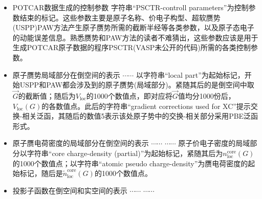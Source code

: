 \begin{itemize}
	\item \textrm{POTCAR}数据生成的控制参数
{\fontsize{8.2pt}{6.2pt}\selectfont{
}}
字符串``PSCTR-controll parameters''为控制参数结束的标记。这些参数主要是原子名称、价电子构型、超软赝势\textrm{(USPP)}\textrm{PAW}方法产生原子赝势所需的截断半经等各类参数，以及原子态电子的动能误差信息。熟悉赝势和\textrm{PAW}方法的读者不难猜出，这些参数应该是用于生成\textrm{POTCAR}原子数据的程序\textrm{PSCTR}(\textrm{VASP}未公开的代码)所需的各类控制参数。
\item 原子赝势局域部分在倒空间的表示
{\fontsize{8.2pt}{6.2pt}\selectfont{
}}
$\cdots\cdots$
{\fontsize{8.2pt}{6.2pt}\selectfont{
}}
以字符串``local part''为起始标记，开始\textrm{USPP}和\textrm{PAW}都会涉及到的原子赝势(局域部分)。紧随其后的是倒空间中取$\vec G$的截断值；随后为$V_{\mathrm{loc}}$的1000个数值点，即对应将$\vec G$值均分1000份后，$V_{\mathrm{loc}}(G)$的各数值点。此后的字符串``gradient corrections used for XC''提示交换-相关泛函，其随后的数值5表示该处原子势中的交换-相关部分采用\textrm{PBE}泛函形式。
 \item 原子赝电荷密度的局域部分在倒空间的表示
{\fontsize{8.2pt}{6.2pt}\selectfont{
}}
$\cdots\cdots$
{\fontsize{8.2pt}{6.2pt}\selectfont{
}}
$\cdots\cdots$
{\fontsize{8.2pt}{6.2pt}\selectfont{
}}
原子价电子密度的局域部分以字符串``core charge-density (partial)''为起始标记，紧随其后为$n_{\mathrm{loc}}^{\mathrm{core}}(G)$的1000个数值点；以字符串``atomic pseudo charge-density''为赝电荷密度的起始标记，随后是$\tilde n_{\mathrm{loc}}^{\mathrm{core}}(G)$的1000个数值点。
\item 投影子函数在倒空间和实空间的表示
{\fontsize{8.2pt}{6.2pt}\selectfont{
}}
$\cdots\cdots$
{\fontsize{8.2pt}{6.2pt}\selectfont{
}}
$\cdots\cdots$
{\fontsize{8.2pt}{6.2pt}\selectfont{
}}
\end{itemize}
